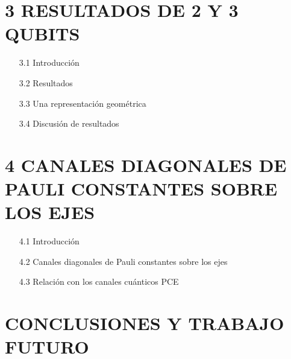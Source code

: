 \section*{3 RESULTADOS DE 2 Y 3 QUBITS}
\begin{itemize}
\item[3.1] Introducción
\item[3.2] Resultados
\item[3.3] Una representación geométrica 
\item[3.4] Discusión de resultados
\end{itemize}

\section*{4 CANALES DIAGONALES DE PAULI CONSTANTES SOBRE
LOS EJES}
\begin{itemize}
\item[4.1] Introducción
\item[4.2] Canales diagonales de Pauli constantes sobre los ejes
\item[4.3] Relación con los canales cuánticos PCE
\end{itemize}

\section*{CONCLUSIONES Y TRABAJO FUTURO}